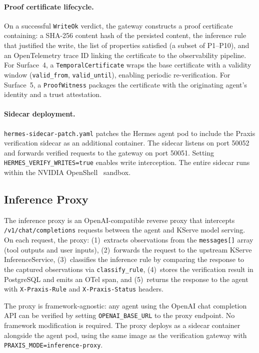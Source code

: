 \documentclass[sigplan,screen,nonacm]{acmart}
\begin{document}
\paragraph{Proof certificate lifecycle.}
On a successful \texttt{WriteOk} verdict, the gateway constructs a proof
certificate containing: a SHA-256 content hash of the persisted content, the
inference rule that justified the write, the list of properties satisfied (a
subset of P1--P10), and an OpenTelemetry trace ID linking the certificate to
the observability pipeline. For Surface~4, a \texttt{TemporalCertificate}
wraps the base certificate with a validity window (\texttt{valid\_from},
\texttt{valid\_until}), enabling periodic re-verification. For Surface~5, a
\texttt{ProofWitness} packages the certificate with the originating agent's
identity and a trust attestation.

\paragraph{Sidecar deployment.}
\texttt{hermes-sidecar-patch.yaml} patches the Hermes agent pod to include
the Praxis verification sidecar as an additional container. The sidecar
listens on port 50052 and forwards verified requests to the gateway on port
50051. Setting \texttt{HERMES\_VERIFY\_WRITES=true} enables write
interception. The entire sidecar runs within the NVIDIA
OpenShell~\cite{nvidia2026openshell} sandbox.

\subsection{Inference Proxy}
\label{sec:proxy}

The inference proxy is an OpenAI-compatible reverse proxy that intercepts
\texttt{/v1/chat/completions} requests between the agent and KServe model
serving. On each request, the proxy: (1)~extracts observations from the
\texttt{messages[]} array (tool outputs and user inputs), (2)~forwards the
request to the upstream KServe InferenceService, (3)~classifies the
inference rule by comparing the response to the captured observations via
\texttt{classify\_rule}, (4)~stores the verification result in PostgreSQL
and emits an OTel span, and (5)~returns the response to the agent with
\texttt{X-Praxis-Rule} and \texttt{X-Praxis-Status} headers.

The proxy is framework-agnostic: any agent using the OpenAI chat completion
API can be verified by setting \texttt{OPENAI\_BASE\_URL} to the proxy
endpoint. No framework modification is required. The proxy deploys as a
sidecar container alongside the agent pod, using the same image as the
verification gateway with \texttt{PRAXIS\_MODE=inference-proxy}.
\end{document}
